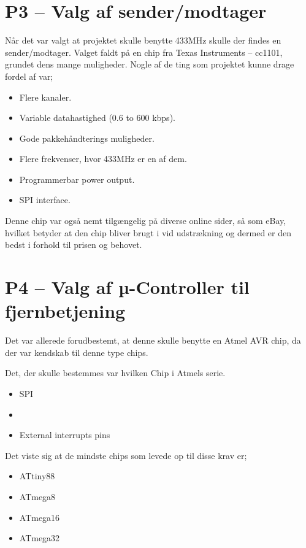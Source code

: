 \documentclass[Main]{subfiles}
\begin{document}
\section[Valg af sender/modtager]{P3 -- Valg af sender/modtager}

Når det var valgt at projektet skulle benytte 433MHz skulle der findes en sender/modtager.
Valget faldt på en chip fra Texas Instruments -- cc1101\cite{TI-cc1101}, grundet dens mange muligheder.
Nogle af de ting som projektet kunne drage fordel af var;

\begin{itemize}
\item Flere kanaler.
\item Variable datahastighed (0.6 to 600 kbps).
\item Gode pakkehåndterings muligheder. 
\item Flere frekvenser, hvor 433MHz er en af dem.
\item Programmerbar power output.
\item SPI interface.
\end{itemize}

Denne chip var også nemt tilgængelig på diverse online sider, så som eBay\cite{eBay}, hvilket betyder at den chip bliver brugt i vid udstrækning og dermed er den bedst i forhold til prisen og behovet.




\section[Valg af µ-Controller til fjernbetjening]{P4 -- Valg af µ-Controller til fjernbetjening}

Det var allerede forudbestemt, at denne skulle benytte en Atmel AVR chip, da der var kendskab til denne type chips.

Det, der skulle bestemmes var hvilken Chip i Atmels serie.

\begin{itemize}
\item SPI
\item \itoc
\item External interrupts pins
\end{itemize}

Det viste sig at de mindste chips som levede op til disse krav er;

\begin{itemize}
\item ATtiny88
\item ATmega8
\item ATmega16
\item ATmega32
\end{itemize}
\end{document}

